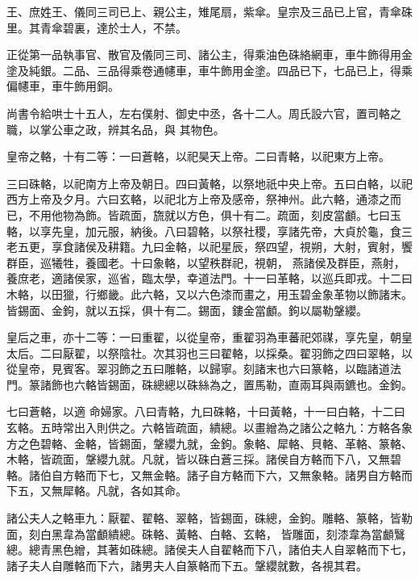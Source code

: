 \begin{pinyinscope}
 王、庶姓王、儀同三司已上、親公主，雉尾扇，紫傘。皇宗及三品已上官，青傘硃里。其青傘碧裏，達於士人，不禁。



 正從第一品執事官、散官及儀同三司、諸公主，得乘油色硃絡網車，車牛飾得用金塗及純銀。二品、三品得乘卷通幰車，車牛飾用金塗。四品已下，七品已上，得乘偏幰車，車牛飾用銅。



 尚書令給哄士十五人，左右僕射、御史中丞，各十二人。周氏設六官，置司輅之職，以掌公車之政，辨其名品，與
 其物色。



 皇帝之輅，十有二等：一曰蒼輅，以祀昊天上帝。二曰青輅，以祀東方上帝。



 三曰硃輅，以祀南方上帝及朝日。四曰黃輅，以祭地祇中央上帝。五曰白輅，以祀西方上帝及夕月。六曰玄輅，以祀北方上帝及感帝，祭神州。此六輅，通漆之而已，不用他物為飾。皆疏面，旒就以方色，俱十有二。疏面，刻皮當顱。七曰玉輅，以享先皇，加元服，納後。八曰碧輅，以祭社稷，享諸先帝，大貞於龜，食三老五更，享食諸侯及耕籍。九曰金輅，以祀星辰，祭四望，視朔，大射，賓射，饗群臣，巡犧牲，養國老。十曰象輅，以望秩群祀，視朝，
 燕諸侯及群臣，燕射，養庶老，適諸侯家，巡省，臨太學，幸道法門。十一曰革輅，以巡兵即戎。十二曰木輅，以田獵，行鄉畿。此六輅，又以六色漆而畫之，用玉碧金象革物以飾諸末。皆錫面、金鉤，就以五採，俱十有二。錫面，鏤金當顱。鉤以屬勒鞶纓。



 皇后之車，亦十二等：一曰重翟，以從皇帝，重翟羽為車蕃祀郊禖，享先皇，朝皇太后。二曰厭翟，以祭陰社。次其羽也三曰翟輅，以採桑。翟羽飾之四曰翠輅，以從皇帝，見賓客。翠羽飾之五曰雕輅，以歸寧。刻諸末也六曰篆輅，以臨諸道法門。篆諸飾也六輅皆錫面，硃總總以硃絲為之，置馬勒，直兩耳與兩鑣也。金鉤。



 七曰蒼輅，以適
 命婦家。八曰青輅，九曰硃輅，十曰黃輅，十一曰白輅，十二曰玄輅。五時常出入則供之。六輅皆疏面，繢總。以畫繒為之諸公之輅九：方輅各象方之色碧輅、金輅，皆錫面，鞶纓九就，金鉤。象輅、犀輅、貝輅、革輅、篆輅、木輅，皆疏面，鞶纓九就。凡就，皆以硃白蒼三採。諸侯自方輅而下八，又無碧輅。諸伯自方輅而下七，又無金輅。諸子自方輅而下六，又無象輅。諸男自方輅而下五，又無犀輅。凡就，各如其命。



 諸公夫人之輅車九：厭翟、翟輅、翠輅，皆錫面，硃總，金鉤。雕輅、篆輅，皆勒面，刻白黑韋為當顱繢總。硃輅、黃輅、白輅、玄輅，
 皆雕面，刻漆韋為當顱鷖總。總青黑色繒，其著如硃總。諸侯夫人自翟輅而下八，諸伯夫人自翠輅而下七，諸子夫人自雕輅而下六，諸男夫人自篆輅而下五。鞶纓就數，各視其君。




\end{pinyinscope}
